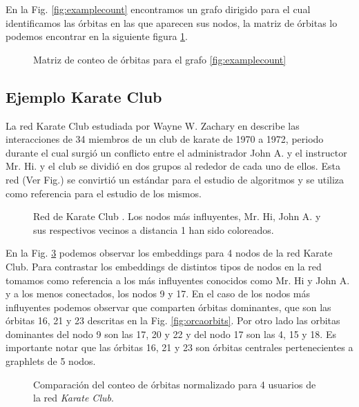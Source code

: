 En la Fig. \ref{fig:examplecount} encontramos un grafo dirigido para el cual identificamos las órbitas en las que aparecen sus nodos, la matriz de órbitas lo podemos encontrar en la siguiente figura \ref{fig:examplecount-vector}.

 \begin{figure}[htbp]
  \centering
  
    \caption{Matriz de conteo de órbitas para el grafo \ref{fig:examplecount}}
    \label{fig:examplecount-vector}
\end{figure}

\subsection{Ejemplo Karate Club}

La red Karate Club estudiada por Wayne W. Zachary en  \cite{zachary_information_1977} describe las interacciones de 34 miembros de un club de karate de 1970 a 1972, periodo durante el cual surgió un conflicto entre el administrador John A. y el instructor Mr. Hi. y el club se dividió en dos grupos al rededor de cada uno de ellos. Esta red (Ver Fig.\label{fig:karateclub}) se convirtió un estándar para el estudio de algoritmos y se utiliza como referencia para el estudio de los mismos.

 \begin{figure}[htbp]
  \centering
  
    \caption{Red de Karate Club \cite{zachary_information_1977}. Los nodos más influyentes, Mr. Hi, John A. y sus respectivos vecinos a distancia 1 han sido coloreados.}
    \label{fig:karateclub}
\end{figure}

En la Fig. \ref{fig:karateorbits} podemos observar los embeddings para 4 nodos de la red Karate Club. Para contrastar los embeddings de distintos tipos de nodos en la red tomamos como referencia a los más influyentes conocidos como Mr. Hi y John A. y a los menos conectados, los nodos 9 y 17. En el caso de los nodos más influyentes podemos observar que comparten órbitas dominantes, que son las órbitas 16, 21 y 23 descritas en la Fig. \ref{fig:orcaorbits}. Por otro lado las orbitas dominantes del nodo 9 son las 17, 20 y 22 y del nodo 17 son las 4, 15 y 18. Es importante notar que las órbitas 16, 21 y 23 son órbitas centrales pertenecientes a graphlets de 5 nodos.

 \begin{figure}[htbp]
   \centering
   
    \caption{Comparación del conteo de órbitas normalizado para 4 usuarios de la red \textit{Karate Club}.}
    \label{fig:karateorbits}
\end{figure}